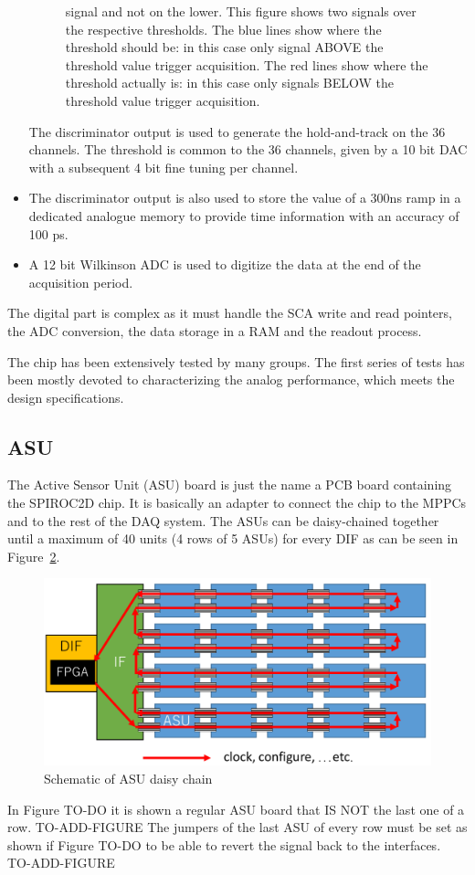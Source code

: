 \begin{itemize}
\begin{figure}
{      signal and not on the lower. This figure shows two signals over
      the respective thresholds. The blue lines show where the
      threshold should be: in this case only signal ABOVE the
      threshold value trigger acquisition. The red lines show where
      the threshold actually is: in this case only signals BELOW the
      threshold value trigger acquisition.}\label{threshold-bug}
  \end{figure}
  The discriminator output is used to generate the hold-and-track on
  the 36 channels. The threshold is common to the 36 channels, given
  by a 10 bit DAC with a subsequent 4 bit fine tuning per channel.
\item The discriminator output is also used to store the value of a
  300ns ramp in a dedicated analogue memory to provide time
  information with an accuracy of 100 ps.
\item A 12 bit Wilkinson ADC is used to digitize the data at the end
  of the acquisition period.
\end{itemize}
The digital part is complex as it must handle the SCA write and read
pointers, the ADC conversion, the data storage in a RAM and the
readout process.

The chip has been extensively tested by many groups. The first series
of tests has been mostly devoted to characterizing the analog
performance, which meets the design specifications.

\subsection{ASU}
The Active Sensor Unit (ASU) board is just the name a PCB board
containing the SPIROC2D chip. It is basically an adapter to connect
the chip to the MPPCs and to the rest of the DAQ system. The ASUs can
be daisy-chained together until a maximum of 40 units (4 rows of 5 ASUs)  for every
DIF as can be seen in Figure~\ref{daisy-chain}.
\begin{figure}[H]
  \centering
    \includegraphics[width=0.7\linewidth]{daisy-chain}
    \caption{Schematic of ASU daisy chain}\label{daisy-chain}
  \end{figure}
In Figure TO-DO it is shown a regular ASU board that IS NOT the last
one of a row.
TO-ADD-FIGURE
The jumpers of the last ASU of every row must be set as shown if
Figure TO-DO to be able to revert the signal back to the interfaces.
TO-ADD-FIGURE
  
